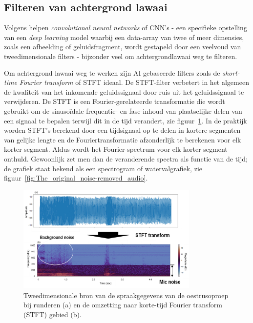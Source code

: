 \clearpage

\subsection{Filteren van achtergrond lawaai}
Volgens \textcite{Jung2021} helpen \textit{convolutional neural networks} of CNN's - een specifieke opstelling van een \textit{deep learning} model waarbij een
data-array van twee of meer dimensies, zoals een afbeelding of geluidsfragment, wordt gestapeld door een veelvoud van tweedimensionale filters - bijzonder veel om achtergrondlawaai weg te filteren.

Om achtergrond lawaai weg te werken zijn AI gebaseerde filters zoals de \textit{short-time Fourier transform} of STFT ideaal. De STFT-filter verbetert in het algemeen de kwaliteit van het inkomende geluidssignaal door ruis uit het geluidssignaal te verwijderen.
De STFT is een Fourier-gerelateerde transformatie die wordt gebruikt om de sinusoïdale frequentie- en fase-inhoud van plaatselijke delen van een signaal te bepalen terwijl dit in de tijd verandert, zie figuur~\ref{fig:conversion}. In de praktijk worden STFT's berekend door een tijdsignaal op te delen in kortere segmenten van gelijke lengte en de Fouriertransformatie afzonderlijk te berekenen voor elk korter segment. Aldus wordt het Fourier-spectrum voor elk korter segment onthuld. Gewoonlijk zet men dan de veranderende spectra
als functie van de tijd;
de grafiek staat bekend als een spectrogram of watervalgrafiek, zie figuur~\ref{fig:The_original_noise-removed_audio}.~\autocite{Jung2021}

\begin{figure}
    \centering
    \includegraphics[width=0.8\textwidth]{./img/conversion.jpg}
    \caption{\label{fig:conversion}Tweedimensionale bron van de spraakgegevens van de oestrusoproep bij runderen (a) en de omzetting naar korte-tijd Fourier transform (STFT) gebied (b).~\autocite{Jung2021}}
\end{figure}

